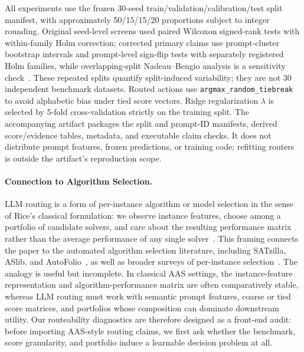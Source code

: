 \documentclass{article}
\begin{document}
All experiments use the frozen 30-seed train/validation/calibration/test split manifest, with approximately 50/15/15/20 proportions subject to integer rounding. Original seed-level screens used paired Wilcoxon signed-rank tests with within-family Holm correction; corrected primary claims use prompt-cluster bootstrap intervals and prompt-level sign-flip tests with separately registered Holm families, while overlapping-split Nadeau--Bengio analysis is a sensitivity check~\citep{nadeau2003inference, demsar2006statistical, dietterich1998approximate, benavoli2017time}. These repeated splits quantify split-induced variability; they are not 30 independent benchmark datasets. Routed actions use \texttt{argmax\_random\_tiebreak} to avoid alphabetic bias under tied score vectors. Ridge regularization $\lambda$ is selected by 5-fold cross-validation strictly on the training split. The accompanying artifact packages the split and prompt-ID manifests, derived score/evidence tables, metadata, and executable claim checks. It does not distribute prompt features, frozen predictions, or training code; refitting routers is outside the artifact's reproduction scope.

\paragraph{Connection to Algorithm Selection.}
LLM routing is a form of per-instance algorithm or model selection in the sense of Rice's classical formulation: we observe instance features, choose among a portfolio of candidate solvers, and care about the resulting performance matrix rather than the average performance of any single solver~\citep{rice1976algorithm}. This framing connects the paper to the automated algorithm selection literature, including SATzilla, ASlib, and AutoFolio~\citep{xu2008satzilla, bischl2016aslib, lindauer2015autofolio}, as well as broader surveys of per-instance selection~\citep{kerschke2019automated}. The analogy is useful but incomplete. In classical AAS settings, the instance-feature representation and algorithm-performance matrix are often comparatively stable, whereas LLM routing must work with semantic prompt features, coarse or tied score matrices, and portfolios whose composition can dominate downstream utility. Our routeability diagnostics are therefore designed as a front-end audit: before importing AAS-style routing claims, we first ask whether the benchmark, score granularity, and portfolio induce a learnable decision problem at all.
\end{document}
